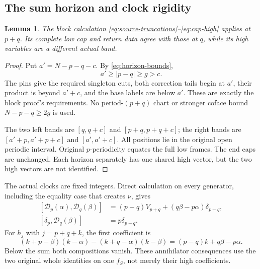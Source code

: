 \documentclass[11pt,a4paper]{amsart}
\numberwithin{equation}{section}
\theoremstyle{plain}
\newtheorem{lemma}[theorem]{Lemma}
\theoremstyle{definition}
\newcommand{\DD}{\mathscr D}
\begin{document}
\subsection{The sum horizon and clock rigidity}
\begin{lemma}\label{lem:sum-horizon}
The block calculation \eqref{eq:source-truncations}--\eqref{eq:cap-high} applies at \(p+q\).  Its complete low cap and return data agree with those at \(q\), while its high variables are a different actual band.
\end{lemma}
\begin{proof}
Put \(a'=N-p-q-c\).  By \eqref{eq:horizon-bounds},
\[
 a'\ge |p-q|\ge g>c.
\]
The pins give the required singleton cuts, both correction tails begin at \(a'\), their product is beyond \(a'+c\), and the base labels are below \(a'\).  These are exactly the block proof's requirements.  No period-\((p+q)\) chart or stronger coface bound \(N-p-q\ge2g\) is used.

The two left bands are \([q,q+c]\) and \([p+q,p+q+c]\); the right bands are \([a'+p,a'+p+c]\) and \([a',a'+c]\).  All positions lie in the original open periodic interval.  Original \(p\)-periodicity equates the full low frames.  The end caps are unchanged.  Each horizon separately has one shared high vector, but the two high vectors are not identified.
\end{proof}

The actual clocks are fixed integers.  Direct calculation on every generator, including the equality case that creates \(\nu\), gives
\[
\begin{split}
 [\DD_p(\alpha),\DD_q(\beta)]
  &=(p-q)V_{p+q}+(q\beta-p\alpha)\delta_{p+q},\\
 [\delta_p,\DD_q(\beta)]&=p\delta_{p+q}.
\end{split}
\]
For \(h_j\) with \(j=p+q+k\), the first coefficient is
\[
 (k+p-\beta)(k-\alpha)-(k+q-\alpha)(k-\beta)
 =(p-q)k+q\beta-p\alpha.
\]
Below the sum both compositions vanish.  These annihilator consequences use the two original whole identities on one \(f_S\), not merely their high coefficients.
\end{document}
